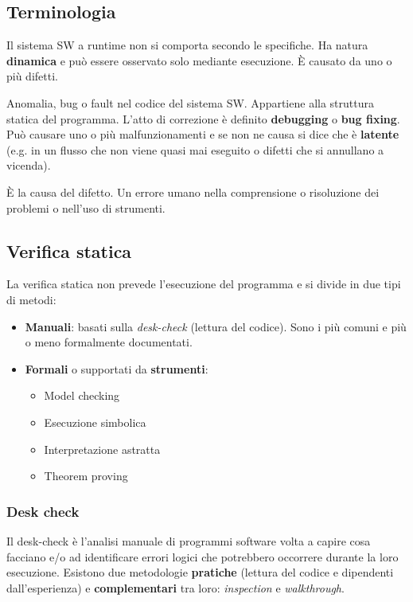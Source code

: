 \subsection{Terminologia}
\begin{definition}[Malfunzionamento]
	Il sistema SW a runtime non si comporta secondo le specifiche. Ha natura \textbf{dinamica} e può essere osservato solo mediante esecuzione. È causato da uno o più difetti.
\end{definition}
\begin{definition}[Difetto]
	Anomalia, bug o fault nel codice del sistema SW. Appartiene alla struttura statica del programma. L'atto di correzione è definito \textbf{debugging} o \textbf{bug fixing}. Può causare uno o più malfunzionamenti e se non ne causa si dice che è \textbf{latente} (e.g. in un flusso che non viene quasi mai eseguito o difetti che si annullano a vicenda).
\end{definition}

\begin{definition}[Errore]
	È la causa del difetto. Un errore umano nella comprensione o risoluzione dei problemi o nell'uso di strumenti.
\end{definition}

\subsection{Verifica statica}
La verifica statica non prevede l'esecuzione del programma e si divide in due tipi di metodi:
\begin{itemize}
	\item \textbf{Manuali}: basati sulla \textit{desk-check} (lettura del codice). Sono i più comuni e più o meno formalmente documentati.
	\item \textbf{Formali} o supportati da \textbf{strumenti}:
	\begin{itemize}
		\item Model checking
		\item Esecuzione simbolica
		\item Interpretazione astratta
		\item Theorem proving
	\end{itemize}
\end{itemize}

\subsubsection{Desk check}
Il desk-check è l'analisi manuale di programmi software volta a capire cosa facciano e/o ad identificare errori logici che potrebbero occorrere durante la loro esecuzione. Esistono due metodologie \textbf{pratiche} (lettura del codice e dipendenti dall'esperienza) e \textbf{complementari} tra loro: \textit{inspection} e \textit{walkthrough}.
